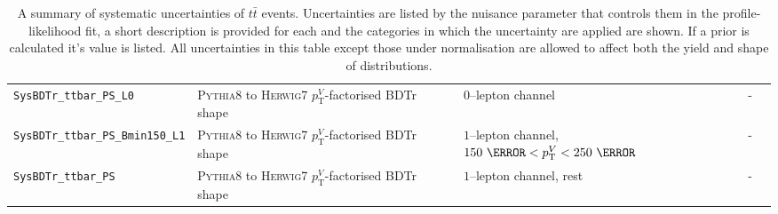 \begin{table}[hbpt!]
{\begin{tabular}{lllll}
      \texttt{SysBDTr\_ttbar\_PS\_L0} & \textsc{Pythia8} to \textsc{Herwig7} $p_{\mathrm{T}}^V$-factorised BDTr shape  & $0$--lepton channel & - \\
      \texttt{SysBDTr\_ttbar\_PS\_Bmin150\_L1} & \textsc{Pythia8} to \textsc{Herwig7} $p_{\mathrm{T}}^V$-factorised BDTr shape  & $1$--lepton channel, $150~\GeV< p_{\mathrm{T}}^V <250~\GeV$ & - \\
      \texttt{SysBDTr\_ttbar\_PS} & \textsc{Pythia8} to \textsc{Herwig7} $p_{\mathrm{T}}^V$-factorised BDTr shape  & $1$--lepton channel, rest & - \\
      \bottomrule
    \end{tabular}
  }
  \caption[A summary of systematic uncertainties on $t\bar{t}$ events.]{A
    summary of systematic uncertainties of $t\bar{t}$ events. Uncertainties are
    listed by the nuisance parameter that controls them in the profile-likelihood
    fit, a short description is provided for each and the categories in which the
    uncertainty are applied are shown. If a prior is calculated it's value is
    listed. All uncertainties in this table except those under normalisation are
    allowed to affect both the yield and shape of distributions.}
  \label{tab:ttbar-systs}
\end{table}